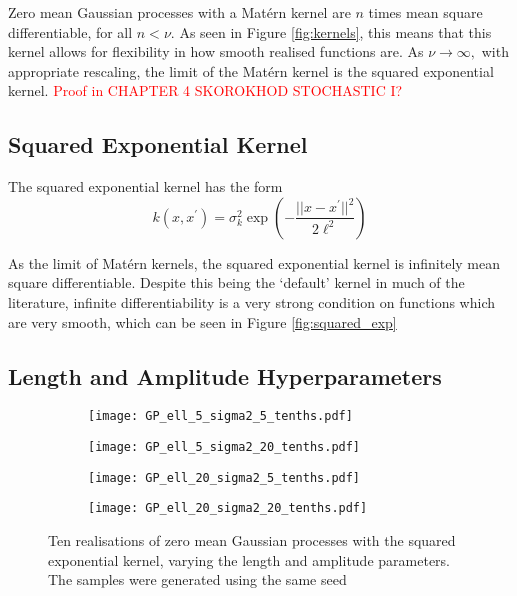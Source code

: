 Zero mean Gaussian processes with a Mat\'ern kernel are $n$ times mean square
differentiable, for all $n < \nu.$ As seen in Figure \ref{fig:kernels}, this
means that this kernel allows for flexibility in how smooth realised functions
are.
As $\nu\to\infty,$ with appropriate
rescaling, the limit of the Mat\'ern kernel is the squared exponential
kernel.\cite[85]{rasmussen_gaussian_2008}
\textcolor{red}{Proof in CHAPTER 4 SKOROKHOD STOCHASTIC I?}

\subsection*{Squared Exponential Kernel}

The squared exponential kernel has the form
$$
    k(x, x^\prime)
    = \sigma^2_k\exp\left(-\frac{||x - x^\prime||^2}{2\ell^2}\right)
$$

As the limit of Mat\'ern kernels, the squared exponential kernel is infinitely
mean square differentiable. Despite this being the `default' kernel in much of
the literature, infinite differentiability is a very strong condition on
functions which are very smooth, which can be seen in Figure
\ref{fig:squared_exp}

\subsection*{Length and Amplitude Hyperparameters}

\begin{figure}[htbp]
    \centering
    \begin{subfigure}[b]{0.5\textwidth}
        \centering
        \texttt{[image: GP\_ell\_5\_sigma2\_5\_tenths.pdf]}
        \label{fig:half_half}
    \end{subfigure}%
    \hfill%
    \begin{subfigure}[b]{0.5\textwidth}
        \centering
        \texttt{[image: GP\_ell\_5\_sigma2\_20\_tenths.pdf]}
        \label{fig:half_two}
    \end{subfigure}
    \begin{subfigure}[b]{0.5\textwidth}
        \centering
        \texttt{[image: GP\_ell\_20\_sigma2\_5\_tenths.pdf]}
        \label{fig:two_half}
    \end{subfigure}%
    \hfill%
    \begin{subfigure}[b]{0.5\textwidth}
        \centering
        \texttt{[image: GP\_ell\_20\_sigma2\_20\_tenths.pdf]}
        \label{fig:two_two}
    \end{subfigure}%
    \caption{
        Ten realisations of zero mean Gaussian processes with the squared
        exponential kernel, varying the length and amplitude parameters.
        The samples were generated using the same seed
    }
    \label{fig:length_amp}
\end{figure}

